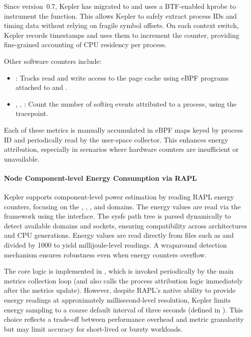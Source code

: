 Since version~0.7, Kepler has migrated to  and uses a BTF-enabled kprobe to instrument the  function. This allows Kepler to safely extract process IDs and timing data without relying on fragile symbol offsets. On each context switch, Kepler records timestamps and uses them to increment the  counter, providing fine-grained accounting of CPU residency per process.

Other software counters include:
\begin{itemize}
  \item {}: Tracks read and write access to the page cache using eBPF programs attached to  and .
  \item {}, , : Count the number of softirq events attributed to a process, using the  tracepoint.
\end{itemize}

Each of these metrics is manually accumulated in eBPF maps keyed by process ID and periodically read by the user-space collector. This enhances energy attribution, especially in scenarios where hardware counters are insufficient or unavailable.

\paragraph{Node Component-level Energy Consumption via RAPL}
Kepler supports component-level power estimation by reading RAPL energy counters, focusing on the , , , and  domains. The energy values are read via the  framework using the  interface. The sysfs path tree is parsed dynamically to detect available domains and sockets, ensuring compatibility across architectures and CPU generations. Energy values are read directly from files such as  and divided by 1000 to yield millijoule-level readings. A wraparound detection mechanism ensures robustness even when energy counters overflow.

The core logic is implemented in , which is invoked periodically by the main metrics collection loop (and also calls the process attribution logic immediately after the metrics update). However, despite RAPL's native ability to provide energy readings at approximately millisecond-level resolution, Kepler limits energy sampling to a coarse default interval of three seconds (defined in ). This choice reflects a trade-off between performance overhead and metric granularity but may limit accuracy for short-lived or bursty workloads.

